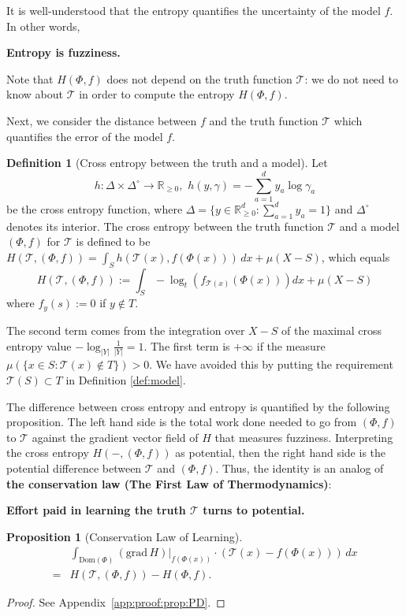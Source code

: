 \documentclass{article}
\theoremstyle{plain}
\newtheorem{proposition}[theorem]{Proposition}
\theoremstyle{definition}
\newtheorem{definition}[theorem]{Definition}
\theoremstyle{remark}
\newcommand{\R}{\mathbb{R}}
\newcommand{\cT}{\mathcal{T}}
\newcommand{\Dom}{\mathrm{Dom}}
\begin{document}
It is well-understood that the entropy quantifies the uncertainty of the model $f$. In other words,
\begin{center}
	{\bf Entropy is fuzziness.}
\end{center} 
Note that $H(\Phi,f)$ does not depend on the truth function $\cT$: we do not need to know about $\cT$ in order to compute the entropy $H(\Phi,f)$.

Next, we consider the distance between $f$ and the truth function $\cT$ which quantifies the error of the model $f$. 

\begin{definition}[Cross entropy between the truth and a model] \label{def:cross}
	Let
	$$ h: \Delta \times \Delta^\circ \to \R_{\geq 0},\,\, h(y,\gamma) = -\sum_{a=1}^d y_a \log \gamma_a $$
	be the cross entropy function, where $\Delta = \{y\in \R_{\geq 0}^d: \sum_{a=1}^d y_a = 1\}$ and $\Delta^\circ$ denotes its interior.
	The cross entropy between the truth function $\cT$ and a model $(\Phi,f)$ for $\cT$ is defined to be $H(\cT,(\Phi,f)) = \int_S h(\cT(x), f(\Phi(x))) \,dx + \mu(X-S)$, which equals
	$$ H(\cT,(\Phi,f)) := \int_S -\log_t \left(f_{\cT(x)}(\Phi(x))\right)  dx + \mu(X-S)$$
	where $f_{y}(s) := 0$ if $y \not\in T$.
\end{definition}
The second term comes from the integration over $X-S$ of the maximal cross entropy value $-\log_{|Y|} \frac{1}{|Y|} = 1$.
The first term is $+\infty$ if the measure $\mu(\{x \in S: \cT(x) \not\in T\}) > 0$. We have avoided this by putting the requirement $\cT(S) \subset T$ in Definition \ref{def:model}.

The difference between cross entropy and entropy is quantified by the following proposition. The left hand side is the total work done needed to go from $(\Phi,f)$ to $\cT$ against the gradient vector field of $H$ that measures fuzziness. Interpreting the cross entropy $H(-,(\Phi,f))$ as potential, then the right hand side is the potential difference between $\cT$ and $(\Phi,f)$. Thus, the identity is an analog of {\bf the conservation law (The First Law of Thermodynamics)}: 
\begin{center}
	{\bf Effort paid in learning the truth $\cT$ turns to potential.}
\end{center}

\begin{proposition}[Conservation Law of Learning] \label{prop:PD}
\begin{align*}
&\int_{\Dom(\Phi)} (\mathrm{grad}\, H)|_{f(\Phi(x))} \cdot (\cT(x) - f(\Phi(x))) \,dx\\
=& H(\cT,(\Phi,f)) - H(\Phi,f).
\end{align*}
\end{proposition}
\begin{proof}
	See Appendix~\ref{app:proof:prop:PD}.
\end{proof}
\end{document}
